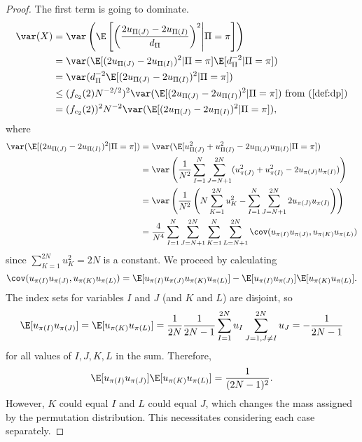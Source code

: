 \begin{proof}
  The first term is going to dominate.
  \begin{align*}
    \var(X) 
    &= \var \left ( \E \left [ \left ( \frac{2u_{\Pi(J)}-2u_{\Pi(I)}}{d_{\Pi}} \right )^2
       \middle | \Pi = \pi \right ] \right ) \\
   &= \var (\E [(2u_{\Pi(J)}-2u_{\Pi(I)})^2 | \Pi = \pi ] \E[d_{\Pi}^{-2} | \Pi = \pi] ) \\
   &= \var (d_{\Pi}^{-2} \E [(2u_{\Pi(J)}-2u_{\Pi(I)})^2 | \Pi = \pi ]) \\
   &\leq (f_{c_2}(2) N^{-2/2})^2 \var(\E [(2u_{\Pi(J)}-2u_{\Pi(I)})^2 | \Pi = \pi ]) 
   \text{ from } (\ref{def:dp}) \\
   &= (f_{c_2}(2))^2 N^{-2} \var(\E [(2u_{\Pi(J)}-2u_{\Pi(I)})^2 | \Pi = \pi ]),
  \end{align*}
  where
  \begin{align*}
    \var (\E[(2u_{\Pi(J)}-2u_{\Pi(I)})^2 | \Pi = \pi]) 
    &= \var(\E[u_{\Pi(J)}^2+u_{\Pi(I)}^2-2u_{\Pi(J)}u_{\Pi(I)}| \Pi = \pi]) \\
    &= \var \left ( \frac{1}{N^2} \sum_{I=1}^{N}\sum_{J=N+1}^{2N}
    (u_{\pi(J)}^2+u_{\pi(I)}^2-2u_{\pi(J)}u_{\pi(I)}) \right ) \\
    &= \var \left ( \frac{1}{N^2} \left ( N \sum_{K=1}^{2N}u_K^2 -
      \sum_{I=1}^{N}\sum_{J=N+1}^{2N}2u_{\pi(J)}u_{\pi(I)} \right ) \right ) \\
    &= \frac{4}{N^4}
    \sum_{I=1}^{N}\sum_{J=N+1}^{2N}\sum_{K=1}^{N}\sum_{L=N+1}^{2N}
    \cov(u_{\pi(I)}u_{\pi(J)},u_{\pi(K)}u_{\pi(L)})
  \end{align*}
  since $\sum_{K=1}^{2N}u_K^2 = 2N$ is a constant.  We proceed by calculating
  \begin{equation*}
    \cov(u_{\pi(I)}u_{\pi(J)},u_{\pi(K)}u_{\pi(L)}) 
    = \E[u_{\pi(I)}u_{\pi(J)}u_{\pi(K)}u_{\pi(L)}] - \E[u_{\pi(I)}u_{\pi(J)}]\E[u_{\pi(K)}u_{\pi(L)}].
  \end{equation*}
  The index sets for variables $I$ and $J$ (and $K$ and $L$) are disjoint, so 
  \begin{equation*}
    \E[u_{\pi(I)}u_{\pi(J)}] = \E[u_{\pi(K)}u_{\pi(L)}]
    = \frac{1}{2N}\frac{1}{2N-1}\sum_{I=1}^{2N} u_{I} \sum_{J=1,J\neq I}^{2N} u_{J} = -\frac{1}{2N-1}
  \end{equation*}
  for all values of $I, J, K, L$ in the sum.  Therefore, 
  \begin{equation*}
    \E[u_{\pi(I)}u_{\pi(J)}]\E[u_{\pi(K)}u_{\pi(L)}] = \frac{1}{(2N-1)^2}.
  \end{equation*}
  However, $K$ could equal $I$ and $L$ could equal $J$, which changes the mass assigned by the
  permutation distribution.  This necessitates considering each case separately.


\end{proof}
